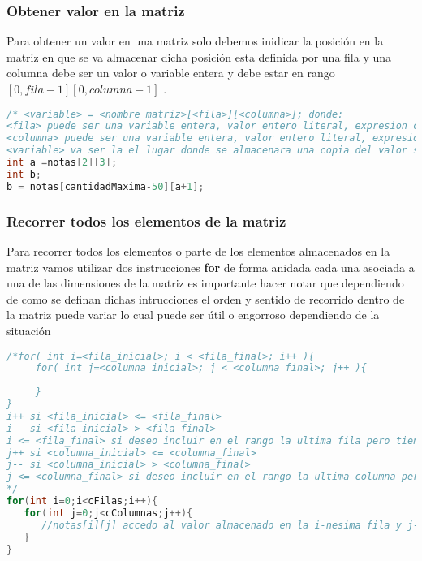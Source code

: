 \subsubsection{Obtener valor en la matriz}

Para obtener un valor en una matriz solo debemos inidicar la posición en la matriz en que se va almacenar dicha posición esta definida por una fila y una columna debe ser un valor o variable entera y debe estar en rango $[0,fila-1][0,columna-1]$ .

\begin{lstlisting}[language=C++]
/* <variable> = <nombre matriz>[<fila>][<columna>]; donde:
<fila> puede ser una variable entera, valor entero literal, expresion cuyo resultado sea entero e indicada la fila a la que quiero acceder en la matriz
<columna> puede ser una variable entera, valor entero literal, expresion cuyo resultado sea entero e indicada la columna a la que quiero acceder en la matriz 
<variable> va ser la el lugar donde se almacenara una copia del valor solicitado al arreglo, debe ser del mismo tipo de dato del arreglo */
int a =notas[2][3];
int b;
b = notas[cantidadMaxima-50][a+1];
\end{lstlisting}

\subsubsection{Recorrer todos los elementos de la matriz}

Para recorrer todos los elementos o parte de los elementos almacenados en la matriz vamos utilizar dos instrucciones \textbf{for} de forma anidada cada una asociada a una de las dimensiones de la matriz es importante hacer notar que dependiendo de como se definan dichas intrucciones el orden y sentido de recorrido dentro de la matriz puede variar lo cual puede ser útil o engorroso dependiendo de la situación

\begin{lstlisting}[language=C++]
/*for( int i=<fila_inicial>; i < <fila_final>; i++ ){
     for( int j=<columna_inicial>; j < <columna_final>; j++ ){
  	
     } 
} 
i++ si <fila_inicial> <= <fila_final>
i-- si <fila_inicial> > <fila_final>
i <= <fila_final> si deseo incluir en el rango la ultima fila pero tiene que ser una fila valida de la matriz
j++ si <columna_inicial> <= <columna_final>
j-- si <columna_inicial> > <columna_final>
j <= <columna_final> si deseo incluir en el rango la ultima columna pero tiene que ser una columna valida de la matriz
*/	
for(int i=0;i<cFilas;i++){
   for(int j=0;j<cColumnas;j++){
      //notas[i][j] accedo al valor almacenado en la i-nesima fila y j-nesima de la matriz
   }
}

\end{lstlisting}



